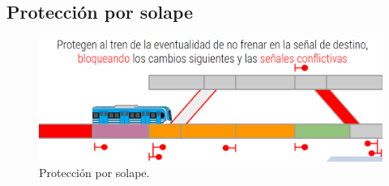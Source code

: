 \subsection{Protección por solape}

\lipsum[1]

    \begin{figure}[!h]
        \centering
        \includegraphics[width=1\textwidth]{Figuras/solape}
        \centering\caption{Protección por solape.}
        \label{fig:solape_1}
    \end{figure}
    
\lipsum[1]